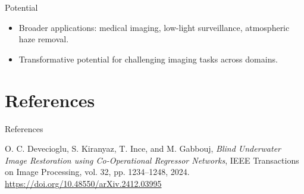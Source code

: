 \documentclass[aspectratio=169,xcolor=dvipsnames]{beamer}
\begin{document}
\begin{frame}{Potential}
\begin{itemize}
    \item Broader applications: medical imaging, low-light surveillance, atmospheric haze removal.
    \item Transformative potential for challenging imaging tasks across domains.
\end{itemize}
\end{frame}


\section{References}
\begin{frame}{References}
\footnotesize
\begin{thebibliography}{9}
O. C. Devecioglu, S. Kiranyaz, T. Ince, and M. Gabbouj,
\emph{Blind Underwater Image Restoration using Co-Operational Regressor Networks},
IEEE Transactions on Image Processing, vol. 32, pp. 1234--1248, 2024.
\\
\url{https://doi.org/10.48550/arXiv.2412.03995}
\end{thebibliography}
\end{frame}
\end{document}
